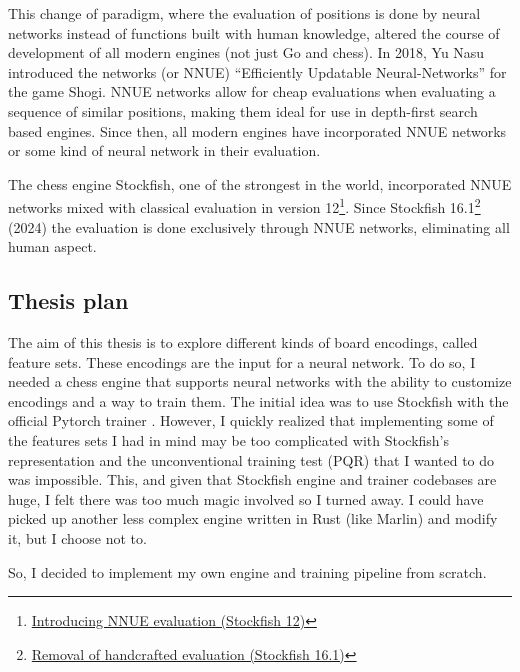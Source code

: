 This change of paradigm, where the evaluation of positions is done by neural networks instead of functions built with human knowledge, altered the course of development of all modern engines (not just Go and chess). In 2018, Yu Nasu introduced the networks  (or NNUE) ``Efficiently Updatable Neural-Networks'' \cite{nnue:2018} for the game Shogi. NNUE networks allow for cheap evaluations when evaluating a sequence of similar positions, making them ideal for use in depth-first search based engines. Since then, all modern engines have incorporated NNUE networks or some kind of neural network in their evaluation.

The chess engine Stockfish, one of the strongest in the world, incorporated NNUE networks mixed with classical evaluation in version 12\footnote[1]{\href{https://stockfishchess.org/blog/2020/introducing-nnue-evaluation/}{Introducing NNUE evaluation (Stockfish 12)}}. Since Stockfish 16.1\footnote[2]{\href{https://stockfishchess.org/blog/2024/stockfish-16-1/}{Removal of handcrafted evaluation (Stockfish 16.1)}} (2024) the evaluation is done exclusively through NNUE networks, eliminating all human aspect.

\newpage
\subsection{Thesis plan}

The aim of this thesis is to explore different kinds of board encodings, called feature sets. These encodings are the input for a neural network. To do so, I needed a chess engine that supports neural networks with the ability to customize encodings and a way to train them. The initial idea was to use Stockfish with the official Pytorch trainer \cite{nnue-pytorch}. However, I quickly realized that implementing some of the features sets I had in mind may be too complicated  with Stockfish's representation and the unconventional training test (PQR) that I wanted to do was impossible. This, and given that Stockfish engine and trainer codebases are huge, I felt there was too much magic involved so I turned away. I could have picked up another less complex engine written in Rust (like Marlin) and modify it, but I choose not to.

So, I decided to implement my own engine and training pipeline from scratch.
